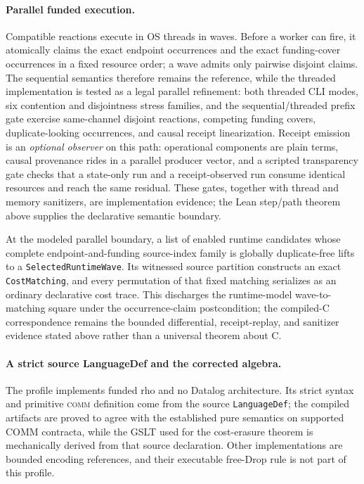 \documentclass[11pt]{article}
\newcommand{\code}[1]{\texttt{#1}}
\begin{document}
\paragraph{Parallel funded execution.} Compatible reactions execute in OS threads in
waves.  Before a worker can fire, it atomically claims the exact endpoint occurrences and
the exact funding-cover occurrences in a fixed resource order; a wave admits only pairwise
disjoint claims.  The sequential semantics therefore remains the reference, while the
threaded implementation is tested as a legal parallel refinement: both threaded CLI modes,
six contention and disjointness stress families, and the sequential/threaded prefix gate
exercise same-channel disjoint reactions, competing funding covers, duplicate-looking
occurrences, and causal receipt linearization.  Receipt emission is an \emph{optional
observer} on this path: operational components are plain terms, causal provenance rides in a
parallel producer vector, and a scripted transparency gate checks that a state-only run and a
receipt-observed run consume identical resources and reach the same residual.  These gates,
together with thread and memory sanitizers, are implementation evidence; the Lean step/path
theorem above supplies the declarative semantic boundary.

At the modeled parallel boundary, a list of enabled runtime candidates whose
complete endpoint-and-funding source-index family is globally duplicate-free
lifts to a \code{SelectedRuntimeWave}.  Its witnessed source partition
constructs an exact \code{CostMatching}, and every permutation of that fixed
matching serializes as an ordinary declarative cost trace.  This discharges the
runtime-model wave-to-matching square under the occurrence-claim postcondition;
the compiled-C correspondence remains the bounded differential, receipt-replay,
and sanitizer evidence stated above rather than a universal theorem about C.

\paragraph{A strict source LanguageDef and the corrected algebra.} The profile implements
funded rho and no Datalog architecture.  Its strict syntax and primitive \textsc{comm}
definition come from the source \code{LanguageDef}; the compiled artifacts are
proved to agree with the established pure semantics on supported COMM contracta,
while the GSLT used for the cost-erasure theorem is mechanically derived from
that source declaration.  Other implementations are bounded encoding
references, and their executable free-Drop rule is not part of this profile.
\end{document}
